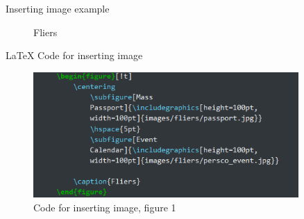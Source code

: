 \documentclass{beamer}
\begin{document}
	\begin{frame}{Inserting image example}
		\begin{figure}[!t]
			\centering
				 \hspace{5pt}
			
			\caption{Fliers}
		\end{figure}
	\end{frame}
	\begin{frame}{LaTeX Code for inserting image}
		\begin{figure}
			\includegraphics[width=0.9\textwidth, height=0.6\textheight]{images/code/fliers_code.png}
			
			\caption{Code for inserting image, figure 1}
		\end{figure}
	\end{frame}
	
	
	
\end{document}
